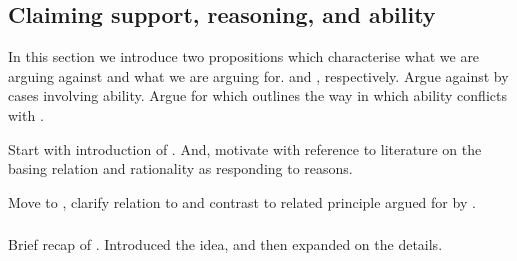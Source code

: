 \subsection{Claiming support, reasoning, and ability}
\label{sec:inter-with-claim}

\begin{note}
  In this section we introduce two propositions which characterise what we are arguing against and what we are arguing for.
  \ESU{-} and \EAS{-}, respectively.
  Argue against \ESU{} by cases involving ability.
  Argue for \EAS{} which outlines the way in which ability conflicts with \ESU{}.

  Start with introduction of \ESU{}.
  And, motivate with reference to literature on the basing relation and rationality as responding to reasons.

  Move to \EAS{}, clarify relation to \ESU{} and contrast to related principle argued for by \citeauthor{Moretti:2019wx}.
\end{note}

\subsubsection{\ESU{}}
\label{sec:esu}

\begin{note}
  Brief recap of \USE{}.
  Introduced the idea, and then expanded on the details.
\end{note}

